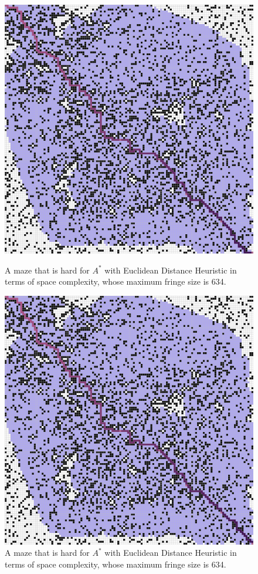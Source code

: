 \documentclass[letter]{article}
\begin{document}
\begin{enumerate}[resume]
\begin{enumerate}
\begin{enumerate}
\begin{figure}
					\includegraphics[width=\textwidth]{../pics/aef/634_2.png}
					\caption{\label{fig:aef2}A maze that is hard for $ A^* $ with Euclidean Distance Heuristic in terms of space complexity, whose maximum fringe size is 634. }
					\endminipage\hfill
					\includegraphics[width=\textwidth]{../pics/aef/634.png}
					\caption{\label{fig:aef3} A maze that is hard for $ A^* $ with Euclidean Distance Heuristic in terms of space complexity, whose maximum fringe size is 634. }
					\endminipage
					\endminipage 
				\end{figure}
				

\end{enumerate}
\end{enumerate}
\end{enumerate}
\end{document}
